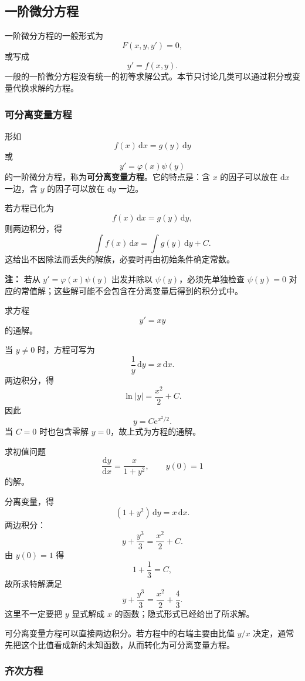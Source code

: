 \documentclass[fontset=fandol]{ctexart}
\newenvironment{warning}{\par\noindent\textbf{注：}\quad}{\par\vspace{0.8em}}
\newcommand{\dd}{\mathrm{d}}
\newcommand{\ee}{\mathrm{e}}
\begin{document}
\subsection{一阶微分方程}

一阶微分方程的一般形式为
\[
F(x,y,y')=0,
\]
或写成
\[
y'=f(x,y).
\]
一般的一阶微分方程没有统一的初等求解公式。本节只讨论几类可以通过积分或变量代换求解的方程。

\subsubsection*{可分离变量方程}

形如
\[
f(x)\,\dd x=g(y)\,\dd y
\]
或
\[
y'=\varphi(x)\psi(y)
\]
的一阶微分方程，称为\textbf{可分离变量方程}。它的特点是：含 $x$ 的因子可以放在 $\dd x$ 一边，含 $y$ 的因子可以放在 $\dd y$ 一边。

若方程已化为
\[
f(x)\,\dd x=g(y)\,\dd y,
\]
则两边积分，得
\[
\int f(x)\,\dd x=\int g(y)\,\dd y+C.
\]
这给出不因除法而丢失的解族，必要时再由初始条件确定常数。

\begin{warning}
若从 \(y'=\varphi(x)\psi(y)\) 出发并除以 \(\psi(y)\)，必须先单独检查 \(\psi(y)=0\) 对应的常值解；这些解可能不会包含在分离变量后得到的积分式中。
\end{warning}

\begin{example}[可分离变量方程]
求方程
\[
y'=xy
\]
的通解。

当 $y\ne0$ 时，方程可写为
\[
\frac1y\,\dd y=x\,\dd x.
\]
两边积分，得
\[
\ln|y|=\frac{x^2}{2}+C.
\]
因此
\[
y=C\ee^{x^2/2}.
\]
当 $C=0$ 时也包含零解 $y=0$，故上式为方程的通解。
\end{example}

\begin{example}[带初始条件的方程]
求初值问题
\[
\frac{\dd y}{\dd x}=\frac{x}{1+y^2},\qquad y(0)=1
\]
的解。

分离变量，得
\[
(1+y^2)\,\dd y=x\,\dd x.
\]
两边积分：
\[
y+\frac{y^3}{3}=\frac{x^2}{2}+C.
\]
由 $y(0)=1$ 得
\[
1+\frac13=C,
\]
故所求特解满足
\[
y+\frac{y^3}{3}=\frac{x^2}{2}+\frac43.
\]
这里不一定要把 $y$ 显式解成 $x$ 的函数；隐式形式已经给出了所求解。
\end{example}

可分离变量方程可以直接两边积分。若方程中的右端主要由比值 $y/x$ 决定，通常先把这个比值看成新的未知函数，从而转化为可分离变量方程。

\subsubsection*{齐次方程}
\end{document}
